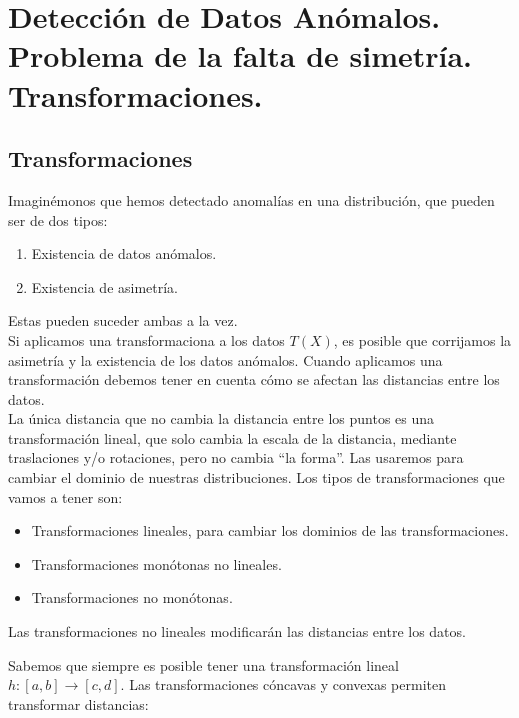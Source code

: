 \chapter{Detección de Datos Anómalos. Problema de la falta de simetría. Transformaciones.}


\section{Transformaciones}
\noindent
Imaginémonos que hemos detectado anomalías en una distribución, que pueden ser de dos tipos:
\begin{enumerate}
    \item Existencia de datos anómalos.
    \item Existencia de asimetría.
\end{enumerate}
Estas pueden suceder ambas a la vez.\\

\noindent
Si aplicamos una transformaciona a los datos $T(X)$, es posible que corrijamos la asimetría y la existencia de los datos anómalos. Cuando aplicamos una transformación debemos tener en cuenta cómo se afectan las distancias entre los datos.\\

\noindent
La única distancia que no cambia la distancia entre los puntos es una transformación lineal, que solo cambia la escala de la distancia, mediante traslaciones y/o rotaciones, pero no cambia ``la forma''. Las usaremos para cambiar el dominio de nuestras distribuciones. Los tipos de transformaciones que vamos a tener son:
\begin{itemize}
    \item Transformaciones lineales, para cambiar los dominios de las transformaciones.
    \item Transformaciones monótonas no lineales.
    \item Transformaciones no monótonas.
\end{itemize}

\noindent
Las transformaciones no lineales modificarán las distancias entre los datos.

\noindent
Sabemos que siempre es posible tener una transformación lineal $h:[a,b]\to [c,d]$. Las transformaciones cóncavas y convexas permiten transformar distancias:

